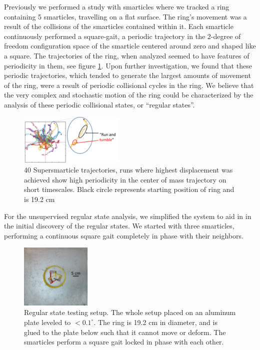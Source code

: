 \documentclass[reprint,prx]{revtex4-1}
\renewcommand{\=}[1]{\stackrel{#1}{=}} %
\renewcommand{\deg}{^{\circ}} %
\renewcommand{\(}{\left (}
\renewcommand{\)}{\right  )}
\renewcommand{\[}{\left [}
\renewcommand{\]}{\right ]}
\newcommand{\<}{\left <}
\renewcommand{\>}{\right >}
\theoremstyle{definition}
\theoremstyle{remark}
\begin{document}
Previously we performed a study with smarticles where we tracked a ring containing 5 smarticles, travelling on a flat surface. The ring’s movement was a result of the collisions of the smarticles contained within it. Each smarticle continuously performed a square-gait, a periodic trajectory in the 2-degree of freedom configuration space of the smarticle centered around zero and shaped like a square. The trajectories of the ring, when analyzed seemed to have features of periodicity in them, see figure \ref{fig:run&tumb}. Upon further investigation, we found that these periodic trajectories, which tended to generate the largest amounts of movement of the ring, were a result of periodic collisional cycles in the ring. We believe that the very complex and stochastic motion of the ring could be characterized by the analysis of these periodic collisional states, or “regular states”.

\begin{figure}
	\includegraphics[width=0.45\textwidth]{RunTumbleRing.pdf}
	\caption{40 Supersmarticle trajectories, runs where highest displacement was achieved show high periodicity in the center of mass trajectory on short timescales. Black circle represents starting position of ring and is 19.2 cm \label{fig:run&tumb}}
\end{figure}

For the unsupervised regular state analysis, we simplified the system to aid in in the initial discovery of the regular states. We started with three smarticles, performing a continuous square gait completely in phase with their neighbors.

\begin{figure}
	\includegraphics[width=0.3\textwidth]{3smRg.pdf}
	\caption{Regular state testing setup. The whole setup placed on an aluminum plate leveled to $ < 0.1\deg $. The ring is 19.2 cm in diameter, and is glued to the plate below such that it cannot move or deform. The smarticles perform a square gait locked in phase with each other.}
\end{figure}
\end{document}
